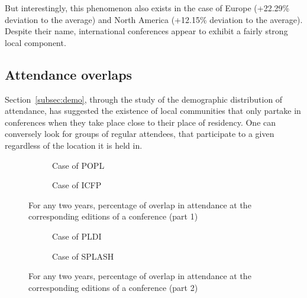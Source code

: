 But interestingly, this phenomenon also exists in the case of Europe (+22.29\%
deviation to the average) and North America (+12.15\% deviation to the average).
Despite their name, international conferences appear to exhibit a fairly strong
local component.

\subsection{Attendance overlaps}
\label{subsec:overlap}

Section~\ref{subsec:demo}, through the study of the demographic distribution of
attendance, has suggested the existence of local communities that only
partake in conferences when they take place close to their place of residency.
One can conversely look for groups of regular attendees, that participate to a given \conf
regardless of the location it is held in.

\begin{figure}
\centering
     \begin{subfigure}[b]{0.4\textwidth}
       \centering
       \caption{Case of POPL}
     \end{subfigure}
     \hfill
     \begin{subfigure}[b]{0.4\textwidth}
       \centering
       \caption{Case of ICFP}
    \end{subfigure}

     \caption{For any two years, percentage of overlap in attendance at the corresponding editions of a conference (part 1)}
     \label{fig:overlap-conf-alpha}
\end{figure}

\begin{figure}
\centering
     \begin{subfigure}[b]{0.4\textwidth}
       \centering
       \caption{Case of PLDI}
     \end{subfigure}
     \begin{subfigure}[b]{0.4\textwidth}
       \centering
       \caption{Case of SPLASH}
     \end{subfigure}

     \caption{For any two years, percentage of overlap in attendance at the corresponding editions of a conference (part 2)}
     \label{fig:overlap-conf-beta}
\end{figure}

